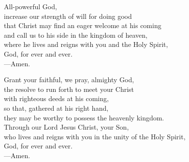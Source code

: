 \prayer


\begin{prayerverse}
All-powerful God,\\
increase our strength of will for doing good\\
that Christ may find an eager welcome at his coming\\
and call us to his side in the kingdom of heaven,\\
where he lives and reigns with you and the Holy Spirit,\\
God, for ever and ever.\\
{\color{red}---\thinspace}Amen.
\end{prayerverse}


\begin{prayerverse}
Grant your faithful, we pray, almighty God,\\
the resolve to run forth to meet your Christ\\
with righteous deeds at his coming,\\
so that, gathered at his right hand,\\
they may be worthy to possess the heavenly kingdom.\\
Through our Lord Jesus Christ, your Son,\\
who lives and reigns with you in the unity of the Holy Spirit,\\
God, for ever and ever.\\
{\color{red}---\thinspace}Amen.
\end{prayerverse}

